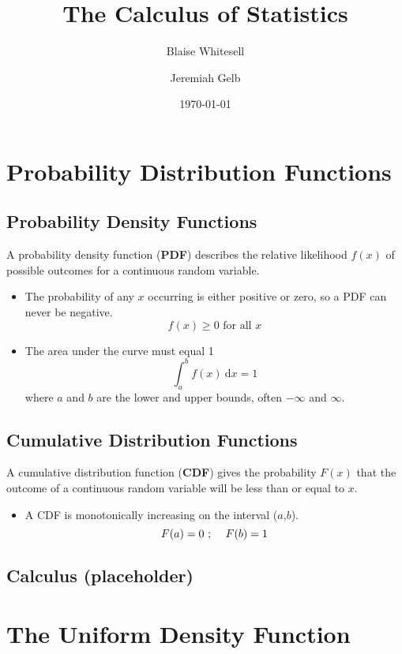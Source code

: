\documentclass[12pt,letterpaper]{article}
\title{The Calculus of Statistics%
}
\author{Blaise Whitesell \and Jeremiah Gelb}
\date{\today}
\begin{document}
\newcommand{\bdef}[1]{\textbf{#1}} %
\newcommand{\dx}{\:\mathrm{d}x} %
\maketitle
\section{Probability Distribution Functions}
\subsection{Probability Density Functions}
A probability density function (\bdef{PDF}) describes the relative likelihood $f(x)$ of possible outcomes for a continuous random variable.
\begin{itemize}
\item The probability of any $x$ occurring is either positive or zero, so a PDF can never be negative.
\begin{equation*}
f(x) \geq 0 \text{ for all }x
\end{equation*}
\item The area under the curve must equal 1
\begin{equation*}
\int_a^b f(x)\dx = 1
\end{equation*}
where $a$ and $b$ are the lower and upper bounds, often $-\infty$ and $\infty$.
\end{itemize}
\subsection{Cumulative Distribution Functions}
A cumulative distribution function (\bdef{CDF}) gives the probability $F(x)$ that the outcome of a continuous random variable will be less than or equal to $x$.
\begin{itemize}
\item A CDF is monotonically increasing on the interval ($a$,$b$).
\begin{equation*}
F(a) = 0 \text{ ; \quad}F(b) = 1
\end{equation*}
\end{itemize}
\subsection{Calculus (placeholder)}
\section{The Uniform Density Function}
\end{document}
